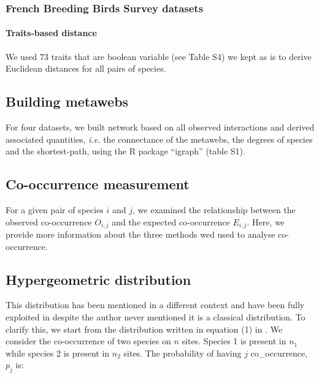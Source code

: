 \subsubsection{French Breeding Birds Survey
datasets}\label{french-breeding-birds-survey-datasets}

\paragraph{Traits-based distance}\label{traits-based-distance-1}

We used 73 traits that are boolean variable (see Table S4) we kept as is
to derive Euclidean distances for all pairs of species.

\subsection{Building metawebs}\label{building-metawebs}

For four datasets, we built network based on all observed interactions
and derived associated quantities, \emph{i.e.} the connectance of the
metawebs, the degrees of species and the shortest-path, using the R
package ``igraph'' (table S1).

\subsection{Co-occurrence measurement}\label{co-occurrence-measurement}

For a given pair of species \(i\) and \(j\), we examined the
relationship between the observed co-occurrence \(O_{i,j}\) and the
expected co-occurrence \(E_{i,j}\). Here, we provide more information
about the three methods wed used to analyse co-occurrence.

\subsection{Hypergeometric
distribution}\label{hypergeometric-distribution}

This distribution has been mentioned in a different context
\citep[see][]{Gilpin_1982} and have been fully exploited in
\citet{Veech_2013} despite the author never mentioned it is a classical
distribution. To clarify this, we start from the distribution written in
equation (1) in \citet{Veech2013}. We consider the co-occurrence of two
species on \(n\) sites. Species 1 is present in \(n_1\) while species 2
is present in \(n_2\) sites. The probability of having \(j\)
co\_occurrence, \(p_j\) is:

